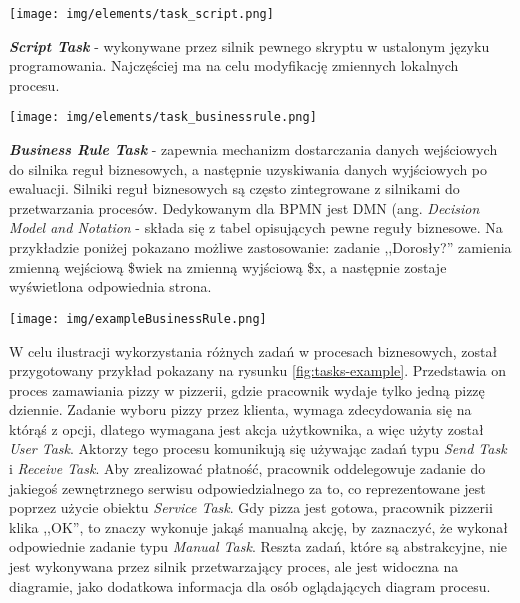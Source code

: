 \documentclass[declaration,shortabstract,mgr]{iithesis}
\newcommand{\bpmn}{BPMN }
\begin{document}
\vspace{\mypointsep}

\noindent\begin{minipage}[t]{0.1\textwidth}\vspace{0pt}
\texttt{[image: img/elements/task\_script.png]}
\end{minipage}\hfill
\begin{minipage}[t]{0.85\textwidth}\vspace{0pt}
\textbf{\textit{Script Task}} - wykonywane przez silnik pewnego skryptu w ustalonym języku programowania. Najczęściej ma na celu modyfikację zmiennych lokalnych procesu.
\end{minipage}

\vspace{\mypointsep}

\noindent\begin{minipage}[t]{0.1\textwidth}\vspace{0pt}
\texttt{[image: img/elements/task\_businessrule.png]}
\end{minipage}\hfill
\begin{minipage}[t]{0.85\textwidth}\vspace{0pt}
\textbf{\textit{Business Rule Task}} - zapewnia mechanizm dostarczania danych wejściowych do silnika reguł biznesowych, a następnie uzyskiwania danych wyjściowych po ewaluacji. Silniki reguł biznesowych są często zintegrowane z silnikami do przetwarzania procesów. Dedykowanym dla \bpmn jest DMN (ang. \textit{Decision Model and Notation} - składa się z tabel opisujących pewne reguły biznesowe. Na przykładzie poniżej pokazano możliwe zastosowanie: zadanie ,,Dorosły?'' zamienia zmienną wejściową \$wiek na zmienną wyjściową \$x, a następnie zostaje wyświetlona odpowiednia strona.
\begin{center}
\texttt{[image: img/exampleBusinessRule.png]}
\end{center}
\end{minipage}

\vspace{\mypointsep}

W celu ilustracji wykorzystania różnych zadań w procesach biznesowych, został przygotowany przykład pokazany na rysunku \ref{fig:tasks-example}. Przedstawia on proces zamawiania pizzy w pizzerii, gdzie pracownik wydaje tylko jedną pizzę dziennie. Zadanie wyboru pizzy przez klienta, wymaga zdecydowania się na którąś z opcji, dlatego wymagana jest akcja użytkownika, a więc użyty został \textit{User Task}. Aktorzy tego procesu komunikują się używając zadań typu \textit{Send Task} i \textit{Receive Task}. Aby zrealizować płatność, pracownik oddelegowuje zadanie do jakiegoś zewnętrznego serwisu odpowiedzialnego za to, co reprezentowane jest poprzez użycie obiektu \textit{Service Task}. Gdy pizza jest gotowa, pracownik pizzerii klika ,,OK'', to znaczy wykonuje jakąś manualną akcję, by zaznaczyć, że wykonał odpowiednie zadanie typu \textit{Manual Task}. Reszta zadań, które są abstrakcyjne, nie jest wykonywana przez silnik przetwarzający proces, ale jest widoczna na diagramie, jako dodatkowa informacja dla osób oglądających diagram procesu.
\end{document}
